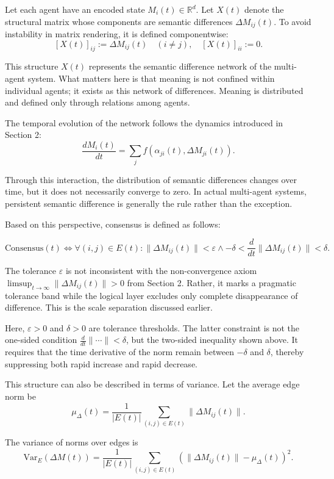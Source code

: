 \documentclass[11pt,a4paper]{article}
\theoremstyle{definition}
\begin{document}
Let each agent have an encoded state $M_i(t) \in \mathbb{R}^d$. Let $X(t)$ denote the structural matrix whose components are semantic differences $\Delta M_{ij}(t)$. To avoid instability in matrix rendering, it is defined componentwise:
\[
[X(t)]_{ij} := \Delta M_{ij}(t) \quad (i \neq j), \quad [X(t)]_{ii} := 0.
\]

This structure $X(t)$ represents the semantic difference network of the multi-agent system. What matters here is that meaning is not confined within individual agents; it exists as this network of differences. Meaning is distributed and defined only through relations among agents.

The temporal evolution of the network follows the dynamics introduced in Section 2:
\[
\frac{dM_i(t)}{dt} = \sum_j f(\alpha_{ji}(t), \Delta M_{ji}(t)).
\]

Through this interaction, the distribution of semantic differences changes over time, but it does not necessarily converge to zero. In actual multi-agent systems, persistent semantic difference is generally the rule rather than the exception.

Based on this perspective, consensus is defined as follows:

\[
\text{Consensus}(t) \Leftrightarrow \forall (i,j) \in E(t) : \|\Delta M_{ij}(t)\| < \varepsilon \land -\delta < \frac{d}{dt}\|\Delta M_{ij}(t)\| < \delta.
\]

The tolerance $\varepsilon$ is not inconsistent with the non-convergence axiom $\limsup_{t \to \infty} \|\Delta M_{ij}(t)\| > 0$ from Section 2. Rather, it marks a pragmatic tolerance band while the logical layer excludes only complete disappearance of difference. This is the scale separation discussed earlier.

Here, $\varepsilon > 0$ and $\delta > 0$ are tolerance thresholds. The latter constraint is not the one-sided condition $\frac{d}{dt}\|\cdots\| < \delta$, but the two-sided inequality shown above. It requires that the time derivative of the norm remain between $-\delta$ and $\delta$, thereby suppressing both rapid increase and rapid decrease.

This structure can also be described in terms of variance. Let the average edge norm be
\[
\mu_\Delta(t) = \frac{1}{|E(t)|} \sum_{(i,j) \in E(t)} \|\Delta M_{ij}(t)\|.
\]

The variance of norms over edges is
\[
\text{Var}_E(\Delta M(t)) = \frac{1}{|E(t)|} \sum_{(i,j) \in E(t)} (\|\Delta M_{ij}(t)\| - \mu_\Delta(t))^2.
\]
\end{document}
